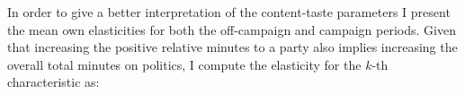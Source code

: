 \documentclass[12pt]{article}
\begin{document}
  In order to give a better interpretation of the content-taste parameters I present the mean own elasticities for both the off-campaign and campaign periods.   Given that increasing the positive relative minutes to a party also implies increasing the overall total minutes on politics, I compute the elasticity for the $k$-th characteristic as: 



	
\end{document}
